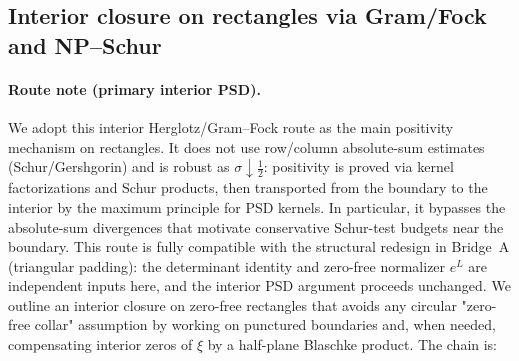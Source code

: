 \documentclass[11pt]{article}
\theoremstyle{definition}
\theoremstyle{remark}
\begin{document}
\iffalse %
\subsection*{Interior closure on rectangles via Gram/Fock and NP--Schur}
\paragraph{Route note (primary interior PSD).}
We adopt this interior Herglotz/Gram--Fock route as the main positivity mechanism on rectangles. It does not use row/column absolute-sum estimates (Schur/Gershgorin) and is robust as $\sigma\downarrow\tfrac12$: positivity is proved via kernel factorizations and Schur products, then transported from the boundary to the interior by the maximum principle for PSD kernels. In particular, it bypasses the absolute-sum divergences that motivate conservative Schur-test budgets near the boundary. This route is fully compatible with the structural redesign in Bridge~A (triangular padding): the determinant identity and zero-free normalizer $e^{L}$ are independent inputs here, and the interior PSD argument proceeds unchanged.
We outline an interior closure on zero-free rectangles that avoids any circular "zero-free collar" assumption by working on punctured boundaries and, when needed, compensating interior zeros of \(\xi\) by a half-plane Blaschke product. The chain is:
\end{document}
